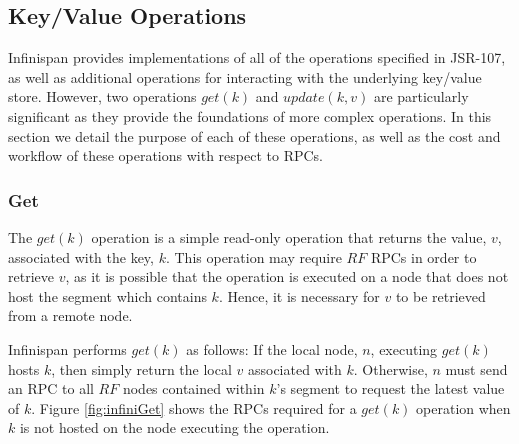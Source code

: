 %    

    \subsection{Key/Value Operations}
    Infinispan provides implementations of all of the operations specified in JSR-107\citep{JSR-107}, as well as additional operations for interacting with the underlying key/value store.  However, two operations $get(k)$ and $update(k,v)$ are particularly significant as they provide the foundations of more complex operations.  In this section we detail the purpose of each of these operations, as well as the cost and workflow of these operations with respect to RPCs.  
    
        \subsubsection*{Get}
        The $get(k)$ operation is a simple read-only operation that returns the value, $v$, associated with the key, $k$.  This operation may require $RF$ RPCs in order to retrieve $v$, as it is possible that the operation is executed on a node that does not host the segment which contains $k$.  Hence, it is necessary for $v$ to be retrieved from a remote node.  
        
        Infinispan performs $get(k)$ as follows: If the local node, $n$, executing $get(k)$ hosts $k$, then simply return the local $v$ associated with $k$.  Otherwise, $n$ must send an RPC to all $RF$ nodes contained within $k$'s segment to request the latest value of $k$.  Figure \ref{fig:infiniGet} shows the RPCs required for a $get(k)$ operation when $k$ is not hosted on the node executing the operation.
        
